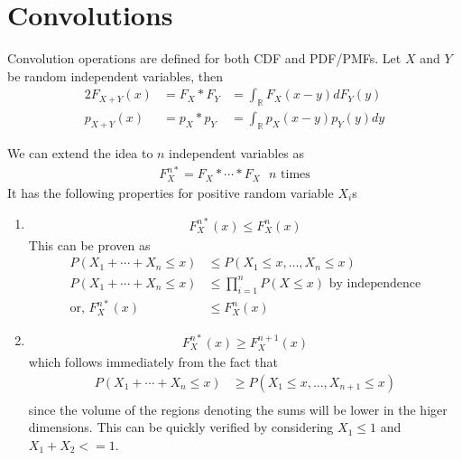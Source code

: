 \documentclass[../probability-notes.tex]{subfiles}
\begin{document}
\chapter{Convolutions} \label{convolution}
Convolution operations are defined for both CDF and PDF/PMFs. Let $X$ and $Y$ be random independent variables, then
\begin{alignat*}{2}
    F_{X+Y}(x) &= F_{X} * F_{Y} &= \int_{\mathbb{R}} F_{X}(x-y) dF_{Y}(y)\\
    p_{X+Y}(x) &= p_{X} * p_{Y} &= \int_{\mathbb{R}} p_{X}(x-y) p_{Y}(y) dy
\end{alignat*}

We can extend the idea to $n$ independent variables as
\begin{align*}
    F_{X}^{n*} = F_{X} * \cdots * F_{X} \text{ $n$ times}
\end{align*}
It has the following properties for positive random variable $X_{i}$s
\begin{enumerate}
    \item
    \begin{align*}
        F_{X}^{n*}(x) \leq F_{X}^{n}(x)
    \end{align*}
    This can be proven as
    \begin{align*}
        P(X_{1} + \cdots + X_{n} \leq x) &\leq P(X_{1} \leq x, \ldots, X_{n} \leq x)\\
        P(X_{1} + \cdots + X_{n} \leq x) &\leq \prod_{i=1}^{n} P(X \leq x) \text{ by independence}\\
        \text{or, } F_{X}^{n*}(x) &\leq F_{X}^{n}(x)
    \end{align*}

    \item
    \begin{align*}
        F_{X}^{n*}(x) \geq F_{X}^{n+1}(x)
    \end{align*}
    which follows immediately from the fact that
    \begin{align*}
        P(X_{1} + \cdots + X_{n} \leq x) &\geq P(X_{1} \leq x, \ldots, X_{n+1} \leq x)\\
    \end{align*}
    since the volume of the regions denoting the sums will be lower in the higer dimensions. This can be quickly verified by considering $X_{1} \leq 1$ and $X_{1} + X_{2} <= 1$.
\end{enumerate}
\end{document}
